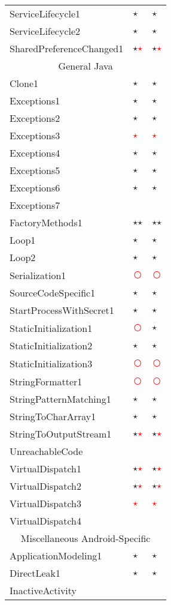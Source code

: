 \documentclass[../draft.tex]{subfiles}
\newcommand{\fp}{\textcolor{white}{\textcircled{\textcolor{red}{$\star$}}}}
\newcommand{\fn}{\textcolor{red}{\textcircled{ }}}
\newcommand{\tp}[0]{\textcircled{$\star$}}
\newcommand{\tsub}[1]{\multicolumn{3}{c}{#1}\\\hline}
\begin{document}
\begin{longtable}{l | l | l}
        ServiceLifecycle1 & \tp & \tp\\
        ServiceLifecycle2 & \tp & \tp\\
        SharedPreferenceChanged1 & \tp \fp & \tp \fp\\
        \hline
        \tsub{General Java}
        Clone1 & \tp & \tp\\
        Exceptions1 & \tp & \tp \\
        Exceptions2 & \tp & \tp\\
        Exceptions3 & \fp & \fp \\
        Exceptions4 & \tp & \tp \\
        Exceptions5 & \tp & \tp \\
        Exceptions6 & \tp & \tp\\
        Exceptions7 & &\\
        FactoryMethods1 & \tp \tp & \tp \tp\\
        Loop1 & \tp & \tp\\
        Loop2 & \tp & \tp\\
        Serialization1 & \fn & \fn\\
        SourceCodeSpecific1 & \tp & \tp\\
        StartProcessWithSecret1 & \tp & \tp\\
        StaticInitialization1 & \fn & \tp\\
        StaticInitialization2 & \tp & \tp\\
        StaticInitialization3 & \fn & \fn\\
        StringFormatter1 & \fn & \fn\\
        StringPatternMatching1 & \tp & \tp\\
        StringToCharArray1 & \tp & \tp\\
        StringToOutputStream1 & \tp \fp & \tp \fp\\
        UnreachableCode & &\\
        VirtualDispatch1 & \tp \fp & \tp \fp\\
        VirtualDispatch2 & \tp \fp & \tp \fp\\
        VirtualDispatch3 & \fp & \fp\\
        VirtualDispatch4 & &\\
        \hline
        \tsub{Miscellaneous Android-Specific}
        ApplicationModeling1 & \tp & \tp\\
        DirectLeak1 & \tp & \tp\\
        InactiveActivity &  & \\

\end{longtable}
\end{document}
